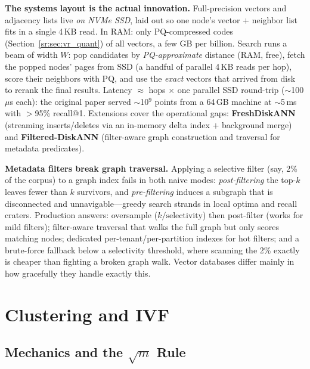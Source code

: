 \textbf{The systems layout is the actual innovation.} Full-precision vectors and adjacency lists live \emph{on NVMe SSD}, laid out so one node's vector $+$ neighbor list fits in a single 4\,KB read. In RAM: only PQ-compressed codes (Section~\ref{sr:sec:vr_quant}) of all vectors, a few GB per billion. Search runs a beam of width $W$: pop candidates by \emph{PQ-approximate} distance (RAM, free), fetch the popped nodes' pages from SSD (a handful of parallel 4\,KB reads per hop), score their neighbors with PQ, and use the \emph{exact} vectors that arrived from disk to rerank the final results. Latency $\approx$ hops $\times$ one parallel SSD round-trip ($\sim$100\,$\mu$s each): the original paper served $\sim$10$^9$ points from a 64\,GB machine at $\sim$5\,ms with $>$95\% recall@1. Extensions cover the operational gaps: \textbf{FreshDiskANN} (streaming inserts/deletes via an in-memory delta index $+$ background merge) and \textbf{Filtered-DiskANN} (filter-aware graph construction and traversal for metadata predicates).

\begin{warningbox}
\textbf{Metadata filters break graph traversal.} Applying a selective filter (say, 2\% of the corpus) to a graph index fails in both naive modes: \emph{post-filtering} the top-$k$ leaves fewer than $k$ survivors, and \emph{pre-filtering} induces a subgraph that is disconnected and unnavigable---greedy search strands in local optima and recall craters. Production answers: oversample ($k / \text{selectivity}$) then post-filter (works for mild filters); filter-aware traversal that walks the full graph but only scores matching nodes; dedicated per-tenant/per-partition indexes for hot filters; and a brute-force fallback below a selectivity threshold, where scanning the 2\% exactly is cheaper than fighting a broken graph walk. Vector databases differ mainly in how gracefully they handle exactly this.
\end{warningbox}

\section{Clustering and IVF}
\label{sr:sec:vr_ivf}

\subsection{Mechanics and the $\sqrt{m}$ Rule}


